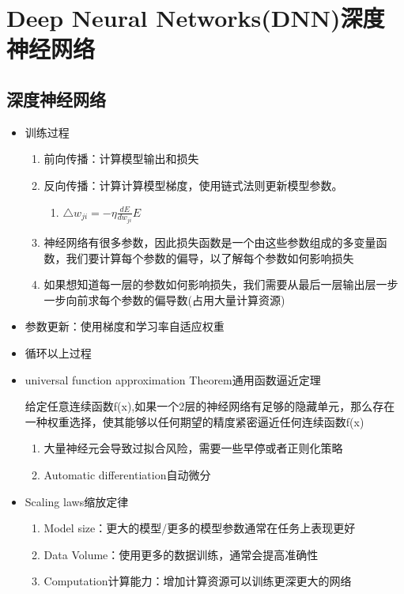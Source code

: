 \documentclass[UTF8]{ctexart}
\begin{document}
\section{Deep Neural Networks(DNN)深度神经网络}
\subsection{深度神经网络}
\begin{itemize}
    \item 训练过程
    \begin{enumerate}
        \item 前向传播：计算模型输出和损失
        \item 反向传播：计算计算模型梯度，使用链式法则更新模型参数。
        
        \begin{enumerate}
            \item $\bigtriangleup w_{ji}=-\eta \frac{dE}{d w_{ji}}E$\end{enumerate}
            \item 神经网络有很多参数，因此损失函数是一个由这些参数组成的多变量函数，我们要计算每个参数的偏导，以了解每个参数如何影响损失
            \item 如果想知道每一层的参数如何影响损失，我们需要从最后一层输出层一步一步向前求每个参数的偏导数(占用大量计算资源)
        \end{enumerate}
        
        
        \item 参数更新：使用梯度和学习率自适应权重
        \item 循环以上过程
    
    \item universal function approximation Theorem通用函数逼近定理
    
    给定任意连续函数f(x),如果一个2层的神经网络有足够的隐藏单元，那么存在一种权重选择，使其能够以任何期望的精度紧密逼近任何连续函数f(x)

    \begin{enumerate}
        \item 大量神经元会导致过拟合风险，需要一些早停或者正则化策略
        \item Automatic differentiation自动微分
    \end{enumerate}

    \item Scaling laws缩放定律
    \begin{enumerate}
        \item Model size：更大的模型/更多的模型参数通常在任务上表现更好
        \item Data Volume：使用更多的数据训练，通常会提高准确性
        \item Computation计算能力：增加计算资源可以训练更深更大的网络
    \end{enumerate}


\end{itemize}
\end{document}
